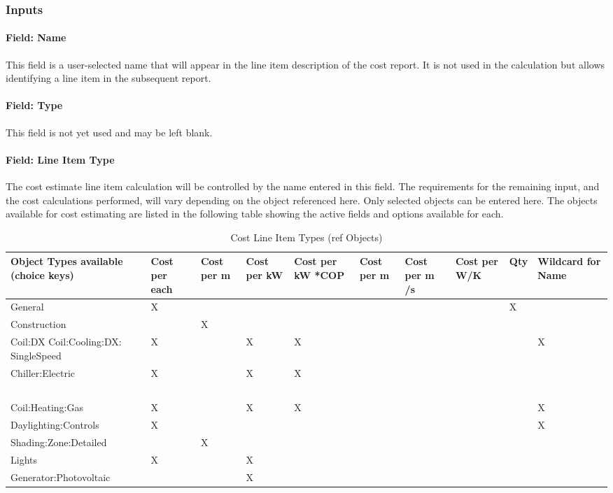 \subsubsection{Inputs}\label{inputs}

\paragraph{Field: Name}\label{field-name}

This field is a user-selected name that will appear in the line item description of the cost report. It is not used in the calculation but allows identifying a line item in the subsequent report.

\paragraph{Field: Type}\label{field-type}

This field is not yet used and may be left blank.

\paragraph{Field: Line Item Type}\label{field-line-item-type}

The cost estimate line item calculation will be controlled by the name entered in this field. The requirements for the remaining input, and the cost calculations performed, will vary depending on the object referenced here. Only selected objects can be entered here. The objects available for cost estimating are listed in the following table showing the active fields and options available for each.

\begin{longtable}[c]{p{0.6in}p{0.6in}p{0.6in}p{0.6in}p{0.6in}p{0.6in}p{0.6in}p{0.6in}p{0.6in}p{0.6in}}
\caption{Cost Line Item Types (ref Objects) \protect \label{table:cost-line-item-types-ref-objects}}\\
\toprule 
Object Types available (choice keys) & Cost per each & Cost per m & Cost per kW & Cost per kW *COP & Cost per m & Cost per m  /s & Cost per W/K & Qty & Wildcard for Name \tabularnewline \midrule
\endhead
General & X & ~ & ~ & ~ & ~ & ~ & ~ & X & ~ \tabularnewline
Construction & ~ & X & ~ & ~ & ~ & ~ & ~ & ~ & ~ \tabularnewline
Coil:DX Coil:Cooling:DX: SingleSpeed & X & ~ & X & X & ~ & ~ & ~ & ~ & X \tabularnewline
Chiller:Electric & X & ~ & X & X & ~ & ~ & ~ & ~ & ~ \tabularnewline
~ & ~ & ~ & ~ & ~ & ~ & ~ & ~ & ~ & ~ \tabularnewline
Coil:Heating:Gas & X & ~ & X & X & ~ & ~ & ~ & ~ & X \tabularnewline
Daylighting:Controls & X & ~ & ~ & ~ & ~ & ~ & ~ & ~ & X \tabularnewline
Shading:Zone:Detailed & ~ & X & ~ & ~ & ~ & ~ & ~ & ~ & ~ \tabularnewline
Lights & X & ~ & X & ~ & ~ & ~ & ~ & ~ & ~ \tabularnewline
Generator:Photovoltaic & ~ & ~ & X & ~ & ~ & ~ & ~ & ~ & ~ \tabularnewline
\bottomrule
\end{longtable}

